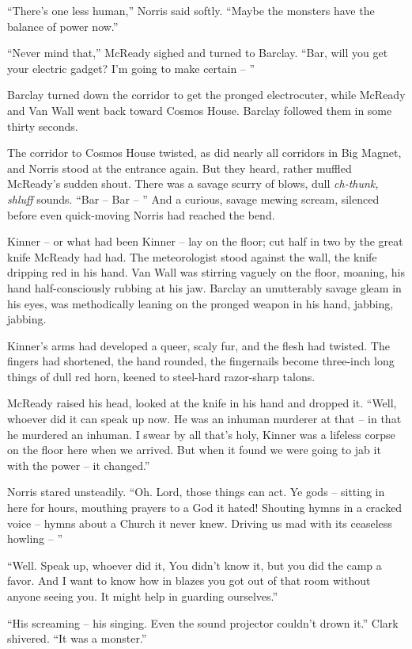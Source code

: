\documentclass[ebook,oneside,11pt]{memoir}				%
\begin{document}
``There's one less human,'' Norris said softly. ``Maybe the monsters have the balance of power now.''

``Never mind that,'' McReady sighed and turned to Barclay. ``Bar, will you get your electric gadget? I'm going to make certain -- ''

Barclay turned down the corridor to get the pronged electrocuter, while McReady and Van Wall went back toward Cosmos House. Barclay followed them in some thirty seconds.

The corridor to Cosmos House twisted, as did nearly all corridors in Big Magnet, and Norris stood at the entrance again. But they heard, rather muffled McReady's sudden shout. There was a savage scurry of blows, dull \emph{ch-thunk, shluff} sounds. ``Bar -- Bar -- '' And a curious, savage mewing scream, silenced before even quick-moving Norris had reached the bend.

Kinner -- or what had been Kinner -- lay on the floor; cut half in two by the great knife McReady had had. The meteorologist stood against the wall, the knife dripping red in his hand. Van Wall was stirring vaguely on the floor, moaning, his hand half-consciously rubbing at his jaw. Barclay an unutterably savage gleam in his eyes, was methodically leaning on the pronged weapon in his hand, jabbing, jabbing.

Kinner's arms had developed a queer, scaly fur, and the flesh had twisted. The fingers had shortened, the hand rounded, the fingernails become three-inch long things of dull red horn, keened to steel-hard razor-sharp talons.

McReady raised his head, looked at the knife in his hand and dropped it. ``Well, whoever did it can speak up now. He was an inhuman murderer at that -- in that he murdered an inhuman. I swear by all that's holy, Kinner was a lifeless corpse on the floor here when we arrived. But when it found we were going to jab it with the power -- it changed.''

Norris stared unsteadily. ``Oh. Lord, those things can act. Ye gods -- sitting in here for hours, mouthing prayers to a God it hated! Shouting hymns in a cracked voice -- hymns about a Church it never knew. Driving us mad with its ceaseless howling -- ''

``Well. Speak up, whoever did it, You didn't know it, but you did the camp a favor. And I want to know how in blazes you got out of that room without anyone seeing you. It might help in guarding ourselves.''

``His screaming -- his singing. Even the sound projector couldn't drown it.'' Clark shivered. ``It was a monster.''
\end{document}
